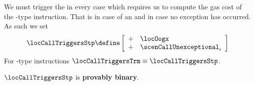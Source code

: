 We must trigger the \stpMod{} in every case which requires us to compute the gas cost of the -type instruction. That is in case of an \oogxSH{} and in case no exception has occurred. As such we set 
\[
	\locCallTriggersStp
	\define
	\left[ \begin{array}{cl}
		+ & \locOogx                    \\
		+ & \scenCallUnexceptional _{i} \\
	\end{array} \right]
\]
\saNote{}
For -type instructions $\locCallTriggersTrm \equiv \locCallTriggersStp$.

\saNote{}
$\locCallTriggersStp$ is \textbf{provably binary}.
